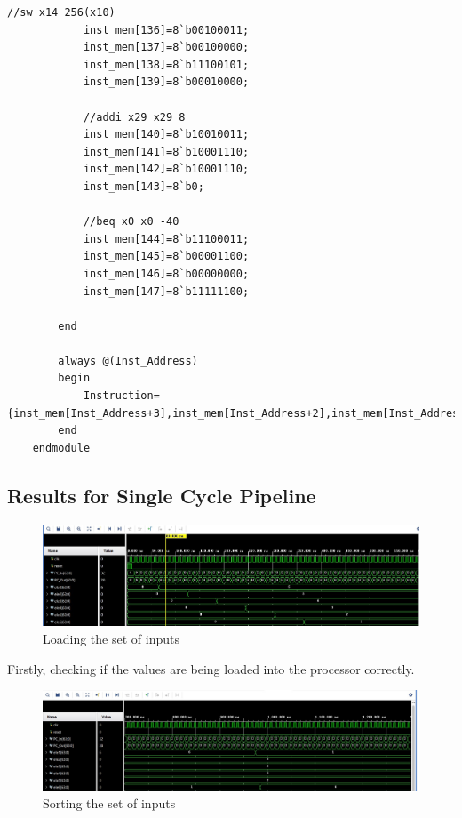 \documentclass{article}
\begin{document}
\begin{lstlisting}[caption={Changes to Instruction Memory}, captionpos=b, language=RISC-V]
            //sw x14 256(x10)
            inst_mem[136]=8`b00100011;
            inst_mem[137]=8`b00100000;
            inst_mem[138]=8`b11100101;
            inst_mem[139]=8`b00010000;
            
            //addi x29 x29 8
            inst_mem[140]=8`b10010011;
            inst_mem[141]=8`b10001110;
            inst_mem[142]=8`b10001110;
            inst_mem[143]=8`b0;
            
            //beq x0 x0 -40
            inst_mem[144]=8`b11100011;
            inst_mem[145]=8`b00001100;
            inst_mem[146]=8`b00000000;
            inst_mem[147]=8`b11111100;
    
        end
        
        always @(Inst_Address)
        begin
            Instruction={inst_mem[Inst_Address+3],inst_mem[Inst_Address+2],inst_mem[Inst_Address+1],inst_mem[Inst_Address]};
        end
    endmodule
\end{lstlisting}

\subsection{Results for Single Cycle Pipeline}

\begin{figure}[h]
    \centering
    \includegraphics*[width = 13 cm]{loadingvalues.jpeg}
    \caption{Loading the set of inputs}
    \label{fig: label 1}
\end{figure}

Firstly, checking if the values are being loaded into the processor correctly. 

\begin{figure}[h]
    \centering
    \includegraphics*[width = 13 cm]{firstsorting.jpeg}
    \caption{Sorting the set of inputs}
    \label{fig: label 2}
\end{figure}
\end{document}
